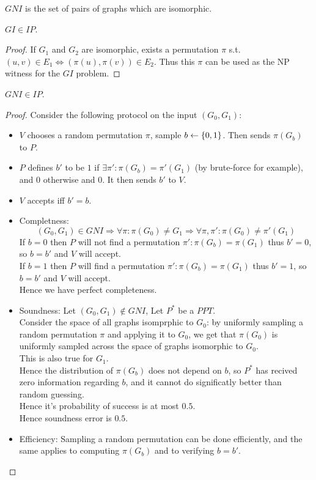 $GNI$ is the set of pairs of graphs which are isomorphic.\\
\begin{theorem}
    $GI\in IP$.
\end{theorem}
\begin{proof}
    If $G_1$ and $G_2$ are isomorphic,
    exists a permutation $\pi$ s.t. $(u,v)\in E_1 \iff (\pi(u), \pi(v))\in E_2$.
    Thus this $\pi$ can be used as the NP witness for the $GI$ problem.
\end{proof}

\begin{theorem}
    $GNI\in IP$.
\end{theorem}
\begin{proof}
    Consider the following protocol on the input $(G_0,G_1)$:
    \begin{itemize}
        \item $V$ chooses a random permutation $\pi$,
        sample $b\leftarrow\{0,1\}$. Then sends $\pi(G_b)$ to $P$.
        \item $P$ defines $b'$ to be $1$ if $\exists \pi':\pi(G_b)=\pi'(G_1)$ (by brute-force for example),
        and $0$ otherwise and $0$. It then sends $b'$ to $V$.
        \item $V$ accepts iff $b'=b$.
    \end{itemize}

    \begin{itemize}
        \item Completness:
        \[
            (G_0,G_1)\in GNI
            \Rightarrow \forall \pi: \pi(G_0)\neq G_1
            \Rightarrow \forall \pi,\pi': \pi(G_0)\neq \pi'(G_1)
        \]
        If $b=0$ then $P$ will not find a permutation $\pi': \pi(G_b)=\pi(G_1)$
        thus $b'=0$, so $b=b'$ and $V$ will accept.\\
        If $b=1$ then $P$ will find a permutation $\pi': \pi(G_b)=\pi(G_1)$
        thus $b'=1$, so $b=b'$ and $V$ will accept.\\
        Hence we have perfect completeness.
        \item Soundness:
        Let $(G_0,G_1)\notin GNI$, Let $P^*$ be a $PPT$.\\
        Consider the space of all graphs isomprphic to $G_0$:
        by uniformly sampling a random permutation $\pi$ and applying
        it to $G_0$, we get that $\pi(G_0)$ is uniformly sampled
        across the space of graphs isomorphic to $G_0$.\\
        This is also true for $G_1$.\\
        Hence the distribution of $\pi(G_b)$ does not depend on $b$,
        so $P^*$ has recived zero information regarding $b$,
        and it cannot do significatly better than random guessing.\\
        Hence it's probability of success is at most $0.5$.\\
        Hence soundness error is $0.5$.
        \item Efficiency:
        Sampling a random permutation can be done efficiently, 
        and the same applies to computing $\pi(G_b)$ and to
        verifying $b=b'$.
    \end{itemize}
\end{proof}